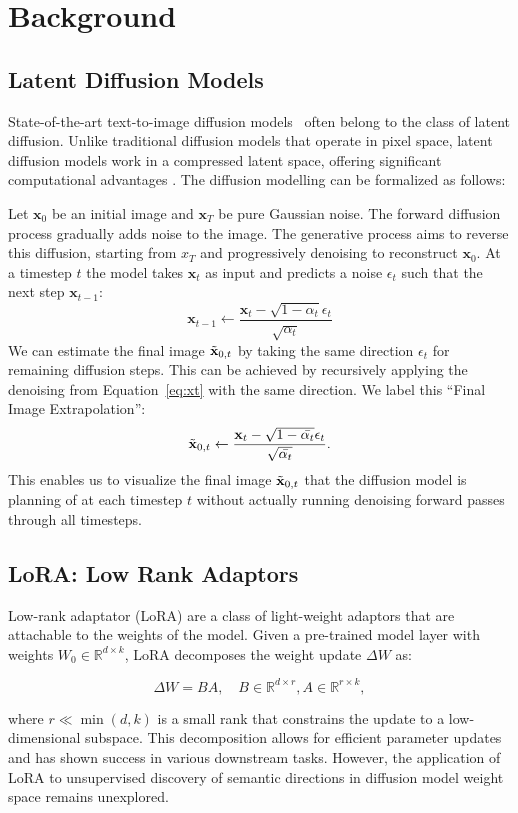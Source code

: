 \section{Background}

\subsection{Latent Diffusion Models}

State-of-the-art text-to-image diffusion models~\cite{sd142022modelcard,sdv22022modelcard,podell2023sdxl, flux} often belong to the class of latent diffusion. Unlike traditional diffusion models that operate in pixel space, latent diffusion models work in a compressed latent space, offering significant computational advantages \cite{rombach2022high}. The diffusion modelling can be formalized as follows:

Let $\mathbf{x}_0$ be an initial image and $\mathbf{x}_T$ be pure Gaussian noise. The forward diffusion process gradually adds noise to the image. The generative process aims to reverse this diffusion, starting from $x_T$ and progressively denoising to reconstruct $\mathbf{x}_0$. At a timestep $t$ the model takes $\mathbf{x}_t$ as input and predicts a noise $\epsilon_t$ such that the next step $\mathbf{x}_{t-1}$:
\begin{equation}
\label{eq:xt}
\mathbf{x}_{t-1} \gets \frac{\mathbf{x}_t - \sqrt{1-\alpha_t}\epsilon_t}{\sqrt{\alpha_t}}
\end{equation}
We can estimate the final image $\Tilde{\mathbf{x}}_{0,t}$ by taking the same direction $\epsilon_t$ for remaining diffusion steps. This can be achieved by recursively applying the denoising from Equation~\ref{eq:xt} with the same direction. We label this ``Final Image Extrapolation'':
\begin{equation}
\label{eq:x0}
\Tilde{\mathbf{x}}_{0,t} \gets \frac{\mathbf{x}_t - \sqrt{1-\bar{\alpha_t}}\epsilon_t}{\sqrt{\bar{\alpha_t}}}.
\end{equation}
This enables us to visualize the final image $\Tilde{\mathbf{x}}_{0,t}$ that the diffusion model is planning of at each timestep $t$ without actually running denoising forward passes through all timesteps.

\subsection{LoRA: Low Rank Adaptors}
Low-rank adaptator (LoRA) \cite{hu2021lora} are a class of light-weight adaptors that are attachable to the weights of the model. Given a pre-trained model layer with weights $W_0 \in \mathbb{R}^{d \times k}$, LoRA decomposes the weight update $\Delta W$ as:

\begin{equation}
\Delta W = BA, \quad B \in \mathbb{R}^{d \times r}, A \in \mathbb{R}^{r \times k},
\end{equation}

\noindent where $r \ll \min(d,k)$ is a small rank that constrains the update to a low-dimensional subspace. This decomposition allows for efficient parameter updates and has shown success in various downstream tasks. However, the application of LoRA to unsupervised discovery of semantic directions in diffusion model weight space remains unexplored.